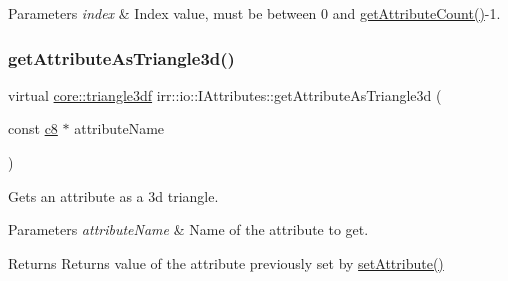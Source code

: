 \begin{DoxyParams}{Parameters}
{\em index} & Index value, must be between 0 and \hyperlink{classirr_1_1io_1_1IAttributes_a796bdd9440ee7ba0b6742a90a82870b6}{get\+Attribute\+Count()}-\/1. \\
\hline
\end{DoxyParams}
\mbox{\label{classirr_1_1io_1_1IAttributes_a11b477925de4a257400cc7c920ec5e40}} 
\subsubsection{\texorpdfstring{get\+Attribute\+As\+Triangle3d()}{getAttributeAsTriangle3d()}\hspace{0.1cm}{\footnotesize\ttfamily [1/2]}}
{\footnotesize\ttfamily virtual \hyperlink{namespaceirr_1_1core_a1112835405bbec5dadf031dc7934e7d0}{core\+::triangle3df} irr\+::io\+::\+I\+Attributes\+::get\+Attribute\+As\+Triangle3d (\begin{DoxyParamCaption}\item[{const \hyperlink{namespaceirr_a9395eaea339bcb546b319e9c96bf7410}{c8} $\ast$}]{attribute\+Name }\end{DoxyParamCaption})\hspace{0.3cm}{\ttfamily [pure virtual]}}



Gets an attribute as a 3d triangle. 


\begin{DoxyParams}{Parameters}
{\em attribute\+Name} & Name of the attribute to get. \\
\hline
\end{DoxyParams}
\begin{DoxyReturn}{Returns}
Returns value of the attribute previously set by \hyperlink{classirr_1_1io_1_1IAttributes_a03fa31acb481ae23678676cc183f09a6}{set\+Attribute()} 
\end{DoxyReturn}
\mbox{\label{classirr_1_1io_1_1IAttributes_a75ff98c5c43f887dcaa2f1c8439d791d}} 
